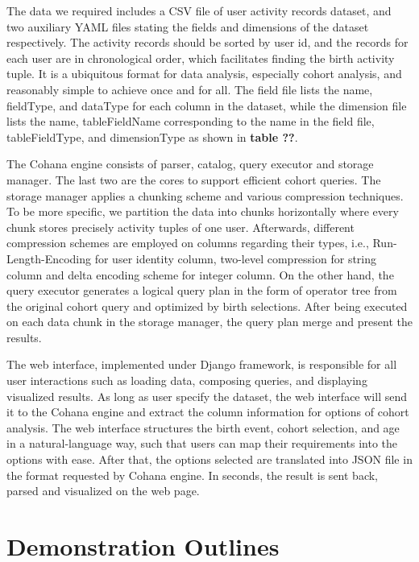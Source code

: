 \documentclass[10pt,conference,letterpaper]{IEEEtran}
\begin{document}
The data we required includes a CSV file of user activity records dataset, and two auxiliary YAML files stating the fields and dimensions of the dataset respectively. The activity records should be sorted by user id, and the records for each user are in chronological order, which facilitates finding the birth activity tuple. It is a ubiquitous format for data analysis, especially cohort analysis, and reasonably simple to achieve once and for all. The field file lists the name, fieldType, and dataType for each column in the dataset, while the dimension file lists the name,  tableFieldName corresponding to the name in the field file, tableFieldType, and dimensionType as shown in \textbf{table ??}.

The Cohana engine consists of parser, catalog, query executor and storage manager. The last two are the cores to support efficient cohort queries. The storage manager applies a chunking scheme and various compression techniques. To be more specific, we partition the data into chunks horizontally where every chunk stores precisely activity tuples of one user. Afterwards, different compression schemes are employed on columns regarding their types, i.e., Run-Length-Encoding for user identity column, two-level compression for string column and delta encoding scheme for integer column. On the other hand, the query executor generates a logical query plan in the form of operator tree from the original cohort query and optimized by birth selections. After being executed on each data chunk in the storage manager, the query plan merge and present the results.

The web interface, implemented under Django framework, is responsible for all user interactions such as loading data, composing queries, and displaying visualized results. As long as user specify the dataset, the web interface will send it to the Cohana engine and extract the column information for options of cohort analysis. The web interface structures the birth event, cohort selection, and age in a natural-language way, such that users can map their requirements into the options with ease. After that, the options selected are translated into JSON file in the format requested by Cohana engine. In seconds, the result is sent back, parsed and visualized on the web page.

\section{Demonstration Outlines}
\end{document}
